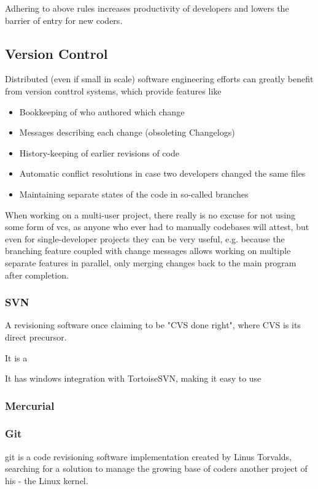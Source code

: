 Adhering to above rules increases productivity of developers and lowers the barrier of entry for new coders.

\subsection{Version Control}
Distributed (even if small in scale) software engineering efforts can greatly benefit from version conttrol systems, which provide features like
\begin{itemize}
	\item Bookkeeping of who authored which change
	\item Messages describing each change (obsoleting Changelogs)
	\item History-keeping of earlier revisions of code
	\item Automatic conflict resolutions in case two developers changed the same files
	\item Maintaining separate states of the code in so-called branches
\end{itemize}

When working on a multi-user project, there really is no excuse for not using some form of \gls{vcs}, as anyone who ever had to manually codebases will attest, but even for single-developer projects they can be very useful, e.g. because the branching feature coupled with change messages allows working on multiple separate features in parallel, only merging changes back to the main program after completion. 


\subsubsection{SVN}
A revisioning software once claiming to be "CVS done right", where CVS is its direct precursor.

It is a  

It has windows integration with TortoiseSVN, making it easy to use
\subsubsection{Mercurial}

\subsubsection{Git}
\gls{git} is a code revisioning software implementation created by Linus Torvalds, searching for a solution to manage the growing base of coders another project of his - the Linux kernel.

